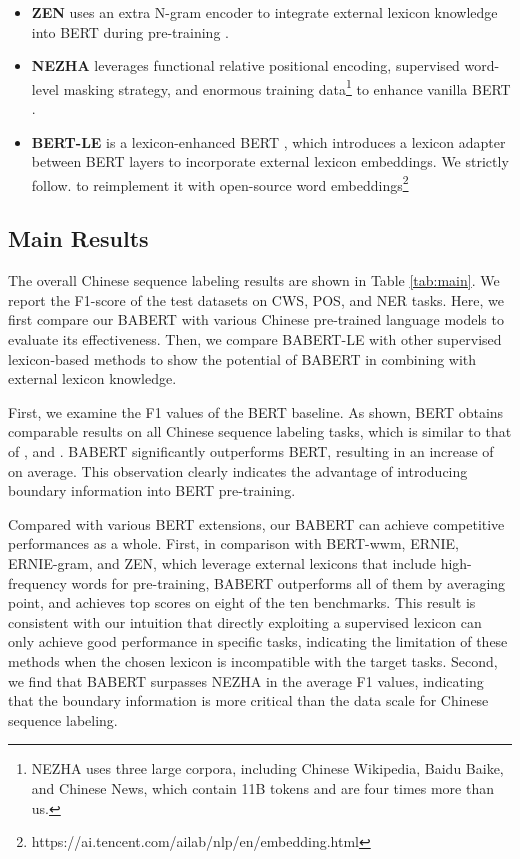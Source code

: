 \documentclass[11pt]{article}
\begin{document}
\begin{CJK}{UTF8}{gbsn}
\begin{itemize}
  \item \textbf{ZEN} uses an extra N-gram encoder to integrate external lexicon knowledge into BERT during pre-training \cite{diao-etal-2020-zen}.



  \item \textbf{NEZHA} leverages functional relative positional encoding, supervised word-level masking strategy, and enormous training data\footnote{NEZHA uses three large corpora, including Chinese Wikipedia, Baidu Baike, and Chinese News, which contain 11B tokens and are four times more than us.}
  to enhance vanilla BERT \cite{wei2019nezha}.

  \item \textbf{BERT-LE} is a lexicon-enhanced BERT \cite{liu-etal-2021-lexicon},
  which introduces a lexicon adapter between BERT layers to incorporate external lexicon embeddings.
  We strictly follow.\citet{liu-etal-2021-lexicon} to reimplement it with open-source word embeddings\footnote{https://ai.tencent.com/ailab/nlp/en/embedding.html}
\end{itemize}


\subsection{Main Results}
The overall Chinese sequence labeling results are shown in Table \ref{tab:main}.
We report the F1-score of the test datasets on CWS, POS, and NER tasks.
Here, we first compare our BABERT with various Chinese pre-trained language models to evaluate its effectiveness.
Then, we compare BABERT-LE with other supervised lexicon-based methods to show the potential of BABERT in combining with external lexicon knowledge.

First, we examine the F1 values of the BERT baseline.
As shown, BERT obtains comparable results on all Chinese sequence labeling tasks,
which is similar to that of \citet{diao-etal-2020-zen}, \citet{tian-etal-2020-joint-chinese} and \citet{liu-etal-2021-lexicon}.
BABERT significantly outperforms BERT, resulting in an increase of  on average.
This observation clearly indicates the advantage of introducing boundary information into BERT pre-training.

Compared with various BERT extensions,
our BABERT can achieve competitive performances as a whole.
First, in comparison with BERT-wwm, ERNIE, ERNIE-gram, and ZEN,
which leverage external lexicons that include high-frequency words for pre-training,
BABERT outperforms all of them by averaging   point, and achieves top scores on eight of the ten benchmarks.
This result is consistent with our intuition that directly exploiting a supervised lexicon can only achieve good performance in specific tasks,
indicating the limitation of these methods when the chosen lexicon is incompatible with the target tasks.
Second, we find that BABERT surpasses NEZHA in the average F1 values,
indicating that the boundary information is more critical than the data scale for Chinese sequence labeling.



\end{CJK}
\end{document}

